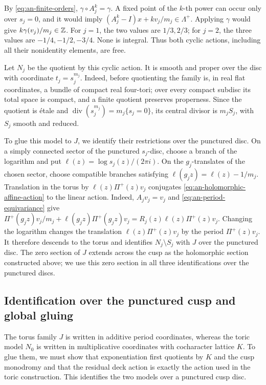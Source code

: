 By \eqref{eq:an-finite-orders}, $\gamma\circ A_j^k=\gamma$.  A fixed point
of the $k$-th power can occur
only over $s_j=0$, and it would imply
$(A_j^k-I)x+kv_j/m_j\in\Lambda^+$.
Applying $\gamma$ would give
$k\gamma(v_j)/m_j\in\mathbb Z$.  For $j=1$, the two values are
$1/3,2/3$; for $j=2$, the three values are
$-1/4,-1/2,-3/4$.  None is integral.  Thus both cyclic actions, including
all their nonidentity elements, are free.

Let $N_j$ be the quotient by this cyclic action.  It is smooth and proper
over the disc with coordinate $t_j=s_j^{m_j}$.
Indeed, before quotienting the family is, in real flat coordinates, a
bundle of compact real four-tori; over every compact subdisc its total
space is compact, and a finite quotient preserves properness.  Since the
quotient is \'etale and
$\operatorname{div}(s_j^{m_j})=m_j\{s_j=0\}$, its central divisor is
$m_jS_j$, with $S_j$ smooth and reduced.

To glue this model to $J$, we identify their restrictions over the
punctured disc.  On a simply connected sector of the punctured $s_j$-disc,
choose a branch of the logarithm and put
$\ell(z)=\log s_j(z)/(2\pi i)$.
On the $g_j$-translates of the chosen sector, choose compatible branches
satisfying $\ell(g_jz)=\ell(z)-1/m_j$.  Translation in the torus by
$\ell(z)\Pi^+(z)v_j$
conjugates \eqref{eq:an-holomorphic-affine-action} to the linear action.
Indeed, $A_jv_j=v_j$ and
\eqref{eq:an-period-equivariance} give
$\Pi^+(g_jz)v_j/m_j+\ell(g_jz)\Pi^+(g_jz)v_j
=R_j(z)\ell(z)\Pi^+(z)v_j$.
Changing the logarithm changes the translation
$\ell(z)\Pi^+(z)v_j$ by the period $\Pi^+(z)v_j$.  It therefore descends to
the torus and identifies $N_j\setminus S_j$ with $J$ over the punctured
disc.  The zero section of $J$ extends across the cusp as the holomorphic
section constructed above; we use this zero section in all three
identifications over the punctured discs.

\subsection{Identification over the punctured cusp and global gluing}

The torus family $J$ is written in additive period coordinates, whereas
the toric model $N_0$ is written in multiplicative coordinates with
cocharacter lattice $K$.  To glue them, we must show that exponentiation
first quotients by $K$ and the cusp monodromy and that the residual deck
action is exactly the action used in the toric construction.  This identifies
the two models over a punctured cusp disc.

